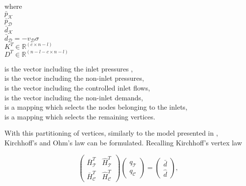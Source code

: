  \begin{minipage}[t]{0.3\textwidth}
where\\
\hspace*{8mm} $\bar{p}_{\mathcal{K}}$ \\
\hspace*{8mm} $\bar{p}_{\mathcal{D}}$  \\
\hspace*{8mm} $\bar{d}_{\mathcal{K}}$ \\
\hspace*{8mm} $\bar{d}_{\mathcal{D}} = -v_{\mathcal{D}} \sigma$  \\
\hspace*{8mm} $K^T \in  \mathbb{R}^{(c  \times n-l)}$ \\
\hspace*{8mm} $D^T \in  \mathbb{R}^{(n-l-c  \times n-l)}$
\end{minipage}
\begin{minipage}[t]{0.68\textwidth}
\vspace*{2mm}
is the vector including the inlet pressures ,\\
is the vector including the non-inlet pressures, \\
is the vector including the controlled inlet flows, \\
is the vector including the non-inlet demands, \\
is a mapping which selects the nodes belonging to the inlets, \\
is a mapping which selects the remaining vertices.
\end{minipage}

With this partitioning of vertices, similarly to the model presented in , Kirchhoff's and Ohm's law can be formulated. Recalling Kirchhoff's vertex law

\begin{equation}
\label{kirchhoffslaw_matrix}
\begin{pmatrix}
   \bar{H}^T_{\mathcal{T}} & \hat{H}^T_{\mathcal{T}} \\[3pt]
   \bar{H}^T_{\mathcal{C}} & \hat{H}^T_{\mathcal{C}} 
   \end{pmatrix}
 \begin{pmatrix} 
 q_\mathcal{T} \\[3pt]
 q_\mathcal{C} 
 \end{pmatrix}
 =
\begin{pmatrix} 
 \bar{d}  \\[3pt] 
 \hat{d}  
 \end{pmatrix},
\end{equation}

